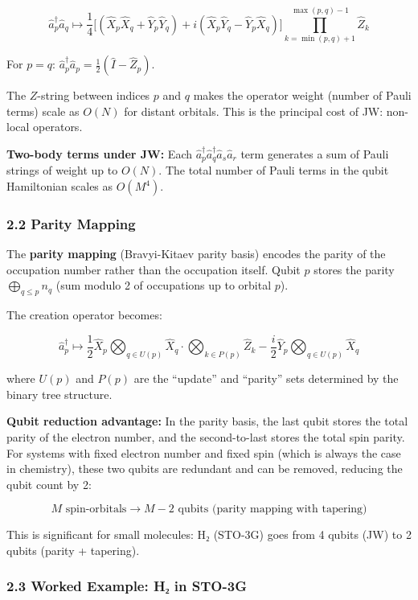 \documentclass[
  11pt,
]{report}
\begin{document}
\[\hat{a}_p^\dagger \hat{a}_q \mapsto \frac{1}{4}\bigl[(\hat{X}_p\hat{X}_q + \hat{Y}_p\hat{Y}_q) + i(\hat{X}_p\hat{Y}_q - \hat{Y}_p\hat{X}_q)\bigr]\prod_{k=\min(p,q)+1}^{\max(p,q)-1}\hat{Z}_k\]

For \(p = q\):
\(\hat{a}_p^\dagger\hat{a}_p = \frac{1}{2}(\hat{I} - \hat{Z}_p)\).

The \(Z\)-string between indices \(p\) and \(q\) makes the operator
weight (number of Pauli terms) scale as \(O(N)\) for distant orbitals.
This is the principal cost of JW: non-local operators.

\textbf{Two-body terms under JW:} Each
\(\hat{a}_p^\dagger\hat{a}_q^\dagger\hat{a}_s\hat{a}_r\) term generates
a sum of Pauli strings of weight up to \(O(N)\). The total number of
Pauli terms in the qubit Hamiltonian scales as \(O(M^4)\).

\subsubsection{2.2 Parity Mapping}\label{parity-mapping}

The \textbf{parity mapping} (Bravyi-Kitaev parity basis) encodes the
parity of the occupation number rather than the occupation itself. Qubit
\(p\) stores the parity \(\bigoplus_{q \leq p} n_q\) (sum modulo 2 of
occupations up to orbital \(p\)).

The creation operator becomes:

\[\hat{a}_p^\dagger \mapsto \frac{1}{2}\hat{X}_p \bigotimes_{q \in U(p)} \hat{X}_q \cdot \bigotimes_{k \in P(p)} \hat{Z}_k - \frac{i}{2}\hat{Y}_p \bigotimes_{q \in U(p)} \hat{X}_q\]

where \(U(p)\) and \(P(p)\) are the ``update'' and ``parity'' sets
determined by the binary tree structure.

\textbf{Qubit reduction advantage:} In the parity basis, the last qubit
stores the total parity of the electron number, and the second-to-last
stores the total spin parity. For systems with fixed electron number and
fixed spin (which is always the case in chemistry), these two qubits are
redundant and can be removed, reducing the qubit count by 2:

\[M \text{ spin-orbitals} \to M - 2 \text{ qubits (parity mapping with tapering)}\]

This is significant for small molecules: H₂ (STO-3G) goes from 4 qubits
(JW) to 2 qubits (parity + tapering).

\subsubsection{2.3 Worked Example: H₂ in
STO-3G}\label{worked-example-hux2082-in-sto-3g}
\end{document}

